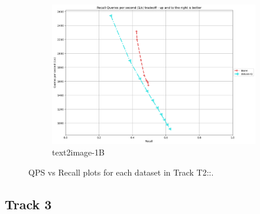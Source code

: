 \begin{figure}[ht]
\begin{subfigure}{0.48\textwidth}
    \includegraphics[width=\linewidth]{../t1_t2/results/T2/neurips21/text2image-1B.png}
    \caption{text2image-1B}
  \end{subfigure}
      
  \caption{QPS vs Recall plots for each dataset in Track T2::.}

\end{figure}

\subsection{Track 3}

